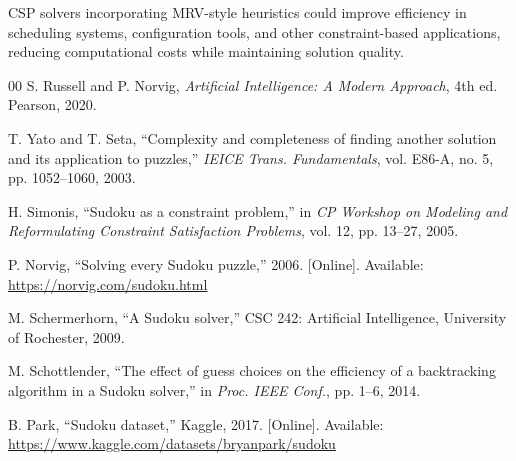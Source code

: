 \documentclass[conference]{IEEEtran}
\begin{document}
CSP solvers incorporating MRV-style heuristics could improve efficiency in scheduling systems, configuration tools, and other constraint-based applications, reducing computational costs while maintaining solution quality.

\begin{thebibliography}{00}
 S. Russell and P. Norvig, \textit{Artificial Intelligence: A Modern Approach}, 4th ed. Pearson, 2020.

 T. Yato and T. Seta, ``Complexity and completeness of finding another solution and its application to puzzles,'' \textit{IEICE Trans. Fundamentals}, vol. E86-A, no. 5, pp. 1052--1060, 2003.

 H. Simonis, ``Sudoku as a constraint problem,'' in \textit{CP Workshop on Modeling and Reformulating Constraint Satisfaction Problems}, vol. 12, pp. 13--27, 2005.

 P. Norvig, ``Solving every Sudoku puzzle,'' 2006. [Online]. Available: \url{https://norvig.com/sudoku.html}

 M. Schermerhorn, ``A Sudoku solver,'' CSC 242: Artificial Intelligence, University of Rochester, 2009.

 M. Schottlender, ``The effect of guess choices on the efficiency of a backtracking algorithm in a Sudoku solver,'' in \textit{Proc. IEEE Conf.}, pp. 1--6, 2014.

 B. Park, ``Sudoku dataset,'' Kaggle, 2017. [Online]. Available: \url{https://www.kaggle.com/datasets/bryanpark/sudoku}

\end{thebibliography}
\end{document}
